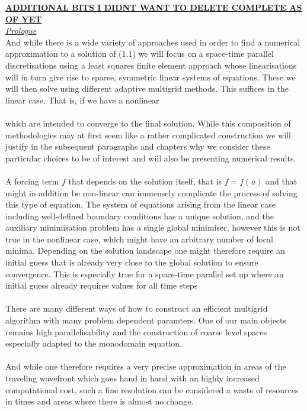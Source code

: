 \documentclass[a4paper, 11pt]{article}
\begin{document}
\textbf{\underline{ ADDITIONAL BITS I DIDNT WANT TO DELETE COMPLETE AS OF YET}}
\bigskip
\\
\textit{\underline{Prologue}} \\

And while there is a wide variety of approaches used in order to find a numerical approximation to a solution of (1.1) we will focus on a space-time parallel discretisations using a least squares finite element approach whose linearisations will in turn give rise to sparse, symmetric linear systems of equations. These we will then solve using different adaptive multigrid methods. This suffices in the linear case. That is, if we have a nonlinear 
\\
\\
which are intended to converge to the final solution. While this composition of methodologies may at first seem like a rather complicated construction we will justify in the subsequent paragraphs and chapters why we consider these particular choices to be of interest and will also be presenting numerical results.
\\
\\
A forcing term $f$ that depends on the solution itself, that is $f = f(u)$ and that might in addition be non-linear can immensely complicate the process of solving this type of equation. The system of equations arising from the linear case including well-defined boundary conditions has a unique solution, and the auxiliary minimisation problem has a single global minimiser, however this is not true in the nonlinear case, which might have an arbitrary number of local minima.  Depending on the solution landscape one might therefore require an initial guess that is already very close to the global solution to ensure convergence. This is especially true for a space-time parallel set up where an initial guess already requires values for all time steps	
\\
\\
There are many different ways of how to construct an efficient multigrid algorithm with many problem dependent paramters. One of our main objects remains high parallelisability and the construction of coarse level spaces especially adapted to the monodomain equation.
\\
\\
And while one therefore requires a very precise approximation in areas of the traveling wavefront which goes hand in hand with an highly increased computational cost, such a fine resolution can be considered a waste of resources in times and areas where there is almost no change. 
\end{document}
